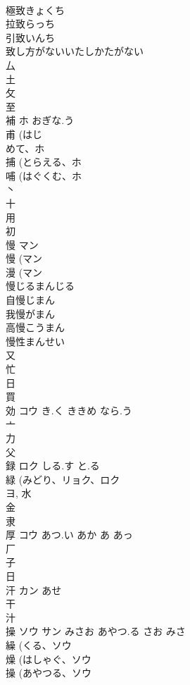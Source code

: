 \documentclass[8pt]{extreport}
\begin{document}
\begin{CJK}{UTF8}{min}
\\	極致きょくち
\\	拉致らっち
\\	引致いんち
\\	致し方がないいたしかたがない
\\	厶 
\\	土 
\\	攵 
\\	至 
\\	補	ホ	おぎな.う	
\\	甫 (はじ
\\	めて、ホ 
\\	捕 (とらえる、ホ 
\\	哺 (はぐくむ、ホ 
\\	丶 
\\	十 
\\	用 
\\	初 
\\	慢	マン		
\\	慢 (マン 
\\	漫 (マン 
\\	慢じるまんじる
\\	自慢じまん
\\	我慢がまん
\\	高慢こうまん
\\	慢性まんせい
\\	又 
\\	忙 
\\	日 
\\	買 
\\	効	コウ	き.く ききめ なら.う	
\\	亠 
\\	力 
\\	父 
\\	録	ロク	しる.す と.る	
\\	緑 (みどり、リョク、ロク 
\\	ヨ, 水 
\\	金 
\\	隶 
\\	厚	コウ	あつ.い あか あ あっ	
\\	厂 
\\	子 
\\	日 
\\	汗	カン	あせ	
\\	干 
\\	汁 
\\	操	ソウ サン	みさお あやつ.る さお みさ	
\\	繰 (くる、ソウ 
\\	燥 (はしゃぐ、ソウ 
\\	操 (あやつる、ソウ 

\end{CJK}
\end{document}
